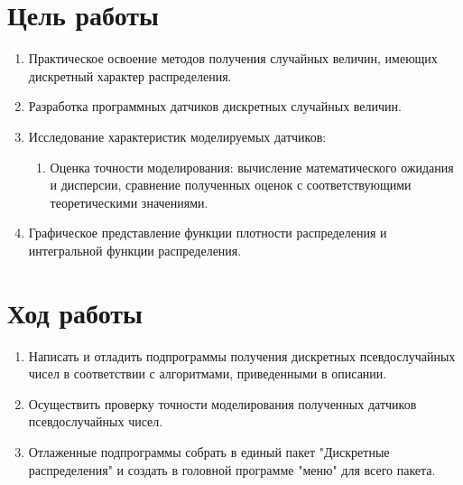 \documentclass{article}
\begin{document}
	\section{Цель работы}
	\begin{enumerate}
	\item Практическое освоение методов получения случайных величин, имеющих дискретный характер распределения.
	\item Разработка программных датчиков дискретных случайных величин.
	\item Исследование характеристик моделируемых датчиков:
	\begin{enumerate}
		\item Оценка точности моделирования: вычисление математического ожидания и дисперсии, сравнение полученных оценок с соответствующими теоретическими значениями.
	\end{enumerate}
	\item Графическое представление функции плотности распределения и интегральной функции распределения.
	\end{enumerate}
	\newpage
	
	\section{Ход работы}
	\begin {enumerate}
		\item Написать и отладить подпрограммы получения дискретных псевдослучайных чисел в соответствии с алгоритмами, приведенными в описании.
		\item Осуществить проверку точности моделирования полученных датчиков псевдослучайных чисел.
		\item Отлаженные подпрограммы собрать в единый пакет "Дискретные распределения" и создать в головной программе "меню" для всего пакета.
	\end{enumerate}
	\newpage
	
\end{document}
